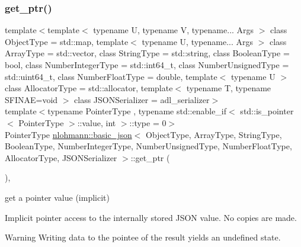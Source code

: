 \subsubsection{\texorpdfstring{get\_ptr()}{get\_ptr()}\hspace{0.1cm}{\footnotesize\ttfamily [1/2]}}
{\footnotesize\ttfamily template$<$template$<$ typename U, typename V, typename... Args $>$ class Object\+Type = std\+::map, template$<$ typename U, typename... Args $>$ class Array\+Type = std\+::vector, class String\+Type  = std\+::string, class Boolean\+Type  = bool, class Number\+Integer\+Type  = std\+::int64\+\_\+t, class Number\+Unsigned\+Type  = std\+::uint64\+\_\+t, class Number\+Float\+Type  = double, template$<$ typename U $>$ class Allocator\+Type = std\+::allocator, template$<$ typename T, typename S\+F\+I\+N\+A\+E=void $>$ class J\+S\+O\+N\+Serializer = adl\+\_\+serializer$>$ \\
template$<$typename Pointer\+Type , typename std\+::enable\+\_\+if$<$ std\+::is\+\_\+pointer$<$ Pointer\+Type $>$\+::value, int $>$\+::type  = 0$>$ \\
Pointer\+Type \mbox{\hyperlink{classnlohmann_1_1basic__json}{nlohmann\+::basic\+\_\+json}}$<$ Object\+Type, Array\+Type, String\+Type, Boolean\+Type, Number\+Integer\+Type, Number\+Unsigned\+Type, Number\+Float\+Type, Allocator\+Type, J\+S\+O\+N\+Serializer $>$\+::get\+\_\+ptr (\begin{DoxyParamCaption}{ }\end{DoxyParamCaption})\hspace{0.3cm}{\ttfamily [inline]}, {\ttfamily [noexcept]}}



get a pointer value (implicit) 

Implicit pointer access to the internally stored J\+S\+ON value. No copies are made.

\begin{DoxyWarning}{Warning}
Writing data to the pointee of the result yields an undefined state.
\end{DoxyWarning}

